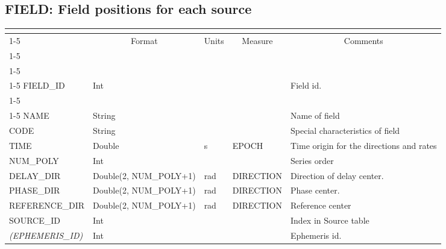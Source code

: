 \documentclass{article}
\newcommand{\defline}[1]{\cline{1-5}
\multicolumn{5}{|l|}{#1} \\
\cline{1-5}}
\newcommand{\definetable}[3][]
{
  \vfill\newpage
  \subsection{#2}
  \label{tbl:#1}
  \vspace{0.15in}
  \small
  \begin{tabular}{|l|p{1.25in}|l|p{.9in}|p{1.4in}|}
  \hline
  \multicolumn{5}{|c|}{\bf #1}\\
  \cline{1-5}
  \multicolumn{1}{|c|}{Name}&\multicolumn{1}{|c|}{Format}&
  \multicolumn{1}{|c|}{Units}&\multicolumn{1}{|c|}{Measure}&
  \multicolumn{1}{|c|}{Comments}\\
  \cline{1-5}
  #3
  \hline
  \end{tabular}
}
\begin{document}
\definetable{FIELD: Field positions for each source}{
\defline{\bf Columns}
\defline{\em Key}
FIELD\_ID & Int & & & Field id. \\
\defline{\em Data}
NAME &       String &    &      & Name of field \\
CODE &       String &    &      & Special characteristics of field \\
TIME &   Double  &      s  & EPOCH & Time origin for the directions and rates\\
NUM\_POLY & Int & & & Series order \\
DELAY\_DIR    &      Double(2, NUM\_POLY+1)  &      rad   &     DIRECTION & Direction of delay center. \\
PHASE\_DIR    &      Double(2, NUM\_POLY+1)  &      rad   &     DIRECTION & Phase center. \\
REFERENCE\_DIR &      Double(2, NUM\_POLY+1)  &      rad   &     DIRECTION & Reference center \\
SOURCE\_ID &      Int    &    &      & Index in Source table\\
{\it (EPHEMERIS\_ID)} &   Int    &    &      & Ephemeris id.\\
}
\end{document}
